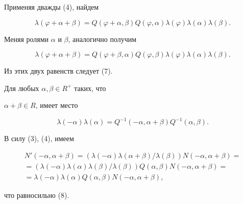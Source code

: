 \begin{pf}


Применяя дважды (4), найдем


$$


\lambda(\varphi+\alpha+\beta)=Q(\varphi+\alpha,\beta)


Q(\varphi,\alpha)\lambda(\varphi)\lambda(\alpha)\lambda(\beta).


$$


Меняя ролями $\alpha$ и $\beta$, аналогично получим


$$


\lambda(\varphi+\alpha+\beta)=Q(\varphi+\beta,\alpha)


Q(\varphi,\beta)\lambda(\varphi)\lambda(\alpha)\lambda(\beta).


$$


Из этих двух равенств следует (7).


\end{pf}





\begin{lem}


Для любых $\alpha,\beta\in R^+$ таких, что


$\alpha+\beta\in R$, имеет место


\begin{equation}


\lambda(-\alpha)\lambda(\alpha)=


Q^{-1}(-\alpha,\alpha+\beta)Q^{-1}(\alpha,\beta).


\end{equation}


\end{lem}





\begin{pf}


В силу (3), (4), имеем


\begin{multline*}


N'(-\alpha,\alpha+\beta)=(\lambda(-\alpha)\lambda(\alpha+\beta)/


\lambda(\beta))N(-\alpha,\alpha+\beta)=\\ =


(\lambda(-\alpha)\lambda(\alpha)\lambda(\beta)/\lambda(\beta))


Q(\alpha,\beta)N(-\alpha,\alpha+\beta)= \\ =


\lambda(-\alpha)\lambda(\alpha)Q(\alpha,\beta)N(-\alpha,\alpha+\beta),


\end{multline*}


что равносильно (8).


\end{pf}





